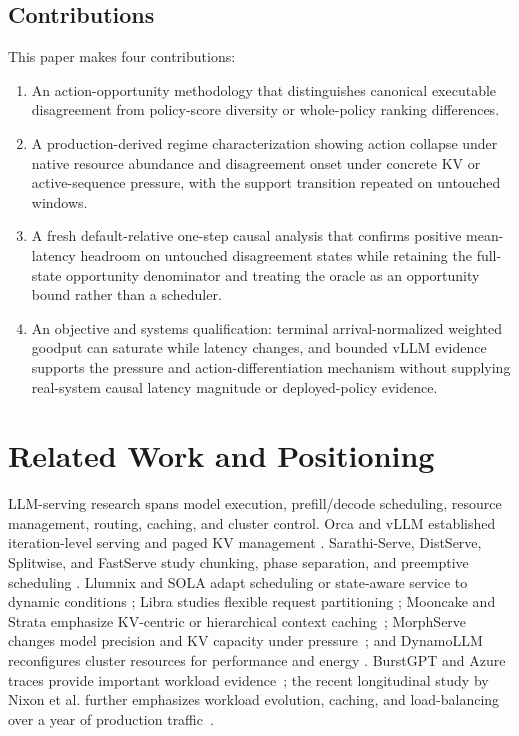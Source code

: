 \documentclass[preprint,12pt]{elsarticle}
\begin{document}
\subsection{Contributions}
This paper makes four contributions:
\begin{enumerate}
  \item An action-opportunity methodology that distinguishes canonical
  executable disagreement from policy-score diversity or whole-policy
  ranking differences.
  \item A production-derived regime characterization showing action collapse
  under native resource abundance and disagreement onset under concrete KV or
  active-sequence pressure, with the support transition repeated on untouched
  windows.
  \item A fresh default-relative one-step causal analysis that confirms
  positive mean-latency headroom on untouched disagreement states while
  retaining the full-state opportunity denominator and treating the oracle as
  an opportunity bound rather than a scheduler.
  \item An objective and systems qualification: terminal arrival-normalized weighted goodput can saturate
  while latency changes, and bounded vLLM evidence supports the pressure and
  action-differentiation mechanism without supplying real-system causal
  latency magnitude or deployed-policy evidence.
\end{enumerate}

\section{Related Work and Positioning}
\label{sec:related}

LLM-serving research spans model execution, prefill/decode scheduling,
resource management, routing, caching, and cluster control. Orca and vLLM
established iteration-level serving and paged KV management
\cite{orca2022,vllm2023}. Sarathi-Serve, DistServe, Splitwise, and FastServe
study chunking, phase separation, and preemptive scheduling
\cite{sarathi2024,distserve2024,splitwise2024,fastserve2026}. Llumnix and
SOLA adapt scheduling or state-aware service to dynamic conditions
\cite{llumnix2024,sola2025}; Libra studies flexible request partitioning
\cite{libra2026}; Mooncake and Strata emphasize KV-centric or hierarchical
context caching~\cite{mooncake2025,strata2025}; MorphServe changes model
precision and KV capacity under pressure~\cite{morphserve2025}; and DynamoLLM
reconfigures cluster resources for performance and energy
\cite{dynamollm2025}. BurstGPT and Azure traces provide important workload
evidence~\cite{burstgpt2025,azurepublicdataset2023}; the recent longitudinal
study by Nixon et al. further emphasizes workload evolution, caching, and
load-balancing over a year of production traffic~\cite{yearllmserving2026}.
\end{document}
